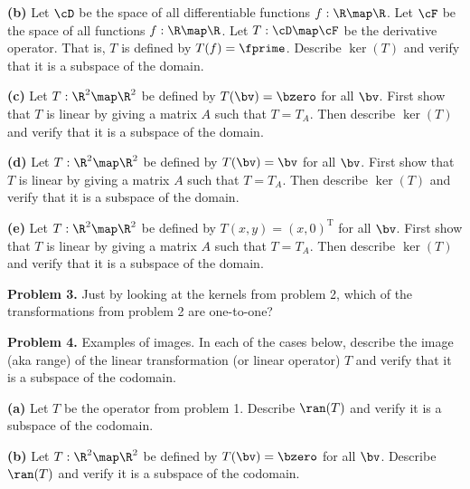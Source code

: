 \documentclass[oneside,12pt]{amsart}
\begin{document}
\textbf{(b)} Let $\cD$ be the space of all differentiable functions
$f:\R\map\R$. Let $\cF$ be the space of all functions $f:\R\map\R$.
Let $T:\cD\map\cF$ be the derivative operator. That is, $T$ is defined by
$T(f) = \fprime$. Describe $\ker(T)$ and
verify that it is a subspace of the domain.

\bigskip
\bigskip
\bigskip
\bigskip
\bigskip
\bigskip
\bigskip
\bigskip
\bigskip
\bigskip


\textbf{(c)} Let $T:\R^2\map\R^2$ be defined by $T(\bv) = \bzero$ for
all $\bv$. First show that $T$ is linear by giving a matrix $A$ such that
$T=T_A$. Then describe $\ker(T)$ and verify that it is a subspace of the domain.

\bigskip
\bigskip
\bigskip
\bigskip
\bigskip
\bigskip
\bigskip
\bigskip
\bigskip
\bigskip

\textbf{(d)} Let $T:\R^2\map\R^2$ be defined by $T(\bv) = \bv$ for
all $\bv$.  First show that $T$ is linear by giving a matrix $A$ such that
$T=T_A$. Then describe $\ker(T)$ and verify that it is a subspace of the domain.

\bigskip
\bigskip
\bigskip
\bigskip
\bigskip
\bigskip
\bigskip
\bigskip
\bigskip
\bigskip


\textbf{(e)} Let $T:\R^2\map\R^2$ be defined by
$T(x,y) = (x, 0)^{\text{T}}$ for
all $\bv$. First show that $T$ is linear by giving a matrix $A$ such that
$T=T_A$. Then describe $\ker(T)$ and verify that it is a subspace of the domain.

\bigskip
\bigskip
\bigskip
\bigskip
\bigskip
\bigskip
\bigskip
\bigskip
\bigskip
\bigskip


\textbf{Problem 3.} Just by looking at the kernels from problem 2, which of
the transformations from problem 2 are one-to-one?

\bigskip
\bigskip
\bigskip
\bigskip
\bigskip
\bigskip
\bigskip
\bigskip
\bigskip
\bigskip


\textbf{Problem 4.} Examples of images. In each of the cases below,
describe the image (aka range) of the linear transformation
(or linear operator) $T$ and verify that it is a subspace of the codomain.

\textbf{(a)} Let $T$ be the operator from problem 1. Describe $\ran(T)$
and verify it is a subspace of the codomain.

\bigskip
\bigskip
\bigskip
\bigskip
\bigskip
\bigskip
\bigskip
\bigskip
\bigskip
\bigskip



\textbf{(b)} Let $T:\R^2\map\R^2$ be defined by $T(\bv) = \bzero$ for
all $\bv$.  Describe $\ran(T)$ and verify it is a subspace of the codomain.
\bigskip
\bigskip
\bigskip
\bigskip
\bigskip
\bigskip
\bigskip
\bigskip
\bigskip
\bigskip
\end{document}
